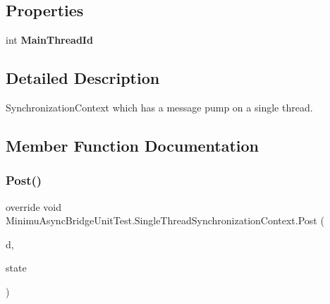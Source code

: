 \subsection*{Properties}
\begin{DoxyCompactItemize}
\item 
\mbox{\label{class_minimu_async_bridge_unit_test_1_1_single_thread_synchronization_context_aaa40e78add3ae26af39fdcc129f20344}} 
int {\bfseries Main\+Thread\+Id}
\end{DoxyCompactItemize}


\subsection{Detailed Description}
Synchronization\+Context which has a message pump on a single thread. 



\subsection{Member Function Documentation}
\mbox{\label{class_minimu_async_bridge_unit_test_1_1_single_thread_synchronization_context_a1c03a1c0f78415785d09881bcf103982}} 
\subsubsection{\texorpdfstring{Post()}{Post()}}
{\footnotesize\ttfamily override void Minimu\+Async\+Bridge\+Unit\+Test.\+Single\+Thread\+Synchronization\+Context.\+Post (\begin{DoxyParamCaption}\item[{Send\+Or\+Post\+Callback}]{d,  }\item[{object}]{state }\end{DoxyParamCaption})\hspace{0.3cm}{\ttfamily [inline]}}



